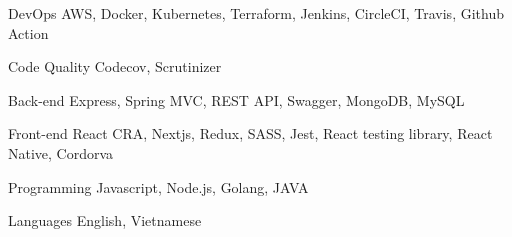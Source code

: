 

\begin{cvskills}

  \cvskill
    {DevOps} %
    {AWS, Docker, Kubernetes, Terraform, Jenkins, CircleCI, Travis, Github Action} %
    
  \cvskill
    {Code Quality} %
    { Codecov, Scrutinizer} %

  \cvskill
    {Back-end} %
    {Express, Spring MVC, REST API, Swagger, MongoDB, MySQL} %

  \cvskill
    {Front-end} %
    {React CRA, Nextjs, Redux, SASS, Jest, React testing library, React Native, Cordorva} %

  \cvskill
    {Programming} %
    {Javascript, Node.js, Golang, JAVA} %

  \cvskill
    {Languages} %
    {English, Vietnamese} %

\end{cvskills}
